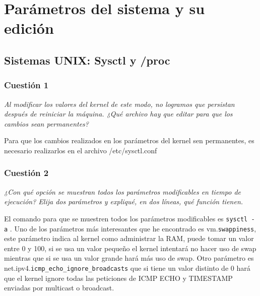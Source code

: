 



\maketitle %
\newpage %
\tableofcontents %
\listoffigures
\newpage

\section{Parámetros del sistema y su edición}
\subsection{Sistemas UNIX: Sysctl y /proc}
\subsubsection{Cuestión 1}
\textit{Al modificar los valores del kernel de este modo, no logramos que persistan después de reiniciar la máquina. ¿Qué archivo hay que editar para que los cambios sean permanentes?}
\newline

Para que los cambios realizados en los parámetros del kernel sen permanentes, es necesario realizarlos en el archivo /etc/sysctl.conf \cite{s1} \cite{s2}

\subsubsection{Cuestión 2}
\textit{¿Con qué opción se muestran todos los parámetros modificables en tiempo de ejecución? Elija dos parámetros y expliqué, en dos líneas, qué función tienen.}
\newline

El comando para que se muestren todos los parámetros modificables es \texttt{sysctl -a} \cite{s3}. Uno de los parámetros más interesantes que he encontrado es vm.\texttt{swappiness}, este parámetro indica al kernel como administrar la RAM, puede tomar un valor entre 0 y 100,  si se usa un valor pequeño el kernel intentará no hacer uso de swap mientras que si se usa un valor grande hará más uso de swap.\cite{sw} Otro parámetro es net.ipv4.\texttt{icmp\_echo\_ignore\_broadcasts} que si tiene un valor distinto de 0 hará que el kernel ignore todas las peticiones de ICMP ECHO y TIMESTAMP enviadas por multicast o broadcast.\cite{net}

